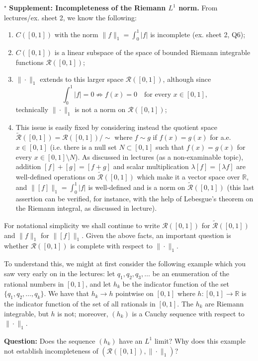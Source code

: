 $^\star$ \textbf{Supplement: Incompleteness of the Riemann $L^1$ norm.} From lectures/ex. sheet 2, we know the following:

\begin{enumerate}
\item[(i)] $C([0,1])$ with the norm $\|f\|_1=\int_0^1|f|$ is incomplete (ex. sheet 2, Q6);
\item[(ii)] $C([0,1])$ is a linear subspace of the space of bounded Riemann integrable functions $\mathcal R([0,1])$;
\item[(iii)] $\|\cdot\|_1$ extends to this larger space $\mathcal R([0,1])$, although since
\[
\int_0^1|f|=0\not\Rightarrow f(x)=0\quad\text{for every } x\in[0,1],
\]
technically $\|\cdot\|_1$ is not a norm on $\mathcal R([0,1])$;
\item[(iv)] This issue is easily fixed by considering instead the quotient space $\widetilde{\mathcal R}([0,1])=\mathcal R([0,1])/\sim$ where $f\sim g$ if $f(x)=g(x)$ for a.e. $x\in[0,1]$ (i.e. there is a null set $N\subset[0,1]$ such that $f(x)=g(x)$ for every $x\in[0,1]\setminus N$). As discussed in lectures (as a non-examinable topic), addition $[f]+[g]=[f+g]$ and scalar multiplication $\lambda[f]=[\lambda f]$ are well-defined operations on $\widetilde{\mathcal R}([0,1])$ which make it a vector space over $\mathbb R$, and $\|[f]\|_1=\int_0^1|f|$ is well-defined and is a norm on $\widetilde{\mathcal R}([0,1])$ (this last assertion can be verified, for instance, with the help of Lebesgue’s theorem on the Riemann integral, as discussed in lecture).
\end{enumerate}

For notational simplicity we shall continue to write $\mathcal R([0,1])$ for $\widetilde{\mathcal R}([0,1])$ and $\|f\|_1$ for $\|[f]\|_1$. Given the above facts, an important question is whether $\mathcal R([0,1])$ is complete with respect to $\|\cdot\|_1$.

To understand this, we might at first consider the following example which you saw very early on in the lectures: let $q_1,q_2,q_3,\ldots$ be an enumeration of the rational numbers in $[0,1]$, and let $h_k$ be the indicator function of the set $\{q_1,q_2,\ldots,q_k\}$. We have that $h_k\to h$ pointwise on $[0,1]$ where $h:[0,1]\to\mathbb R$ is the indicator function of the set of all rationals in $[0,1]$. The $h_k$ are Riemann integrable, but $h$ is not; moreover, $(h_k)$ is a Cauchy sequence with respect to $\|\cdot\|_1$.

\textbf{Question:} Does the sequence $(h_k)$ have an $L^1$ limit? Why does this example not establish incompleteness of $(\mathcal R([0,1]),\|\cdot\|_1)$?

